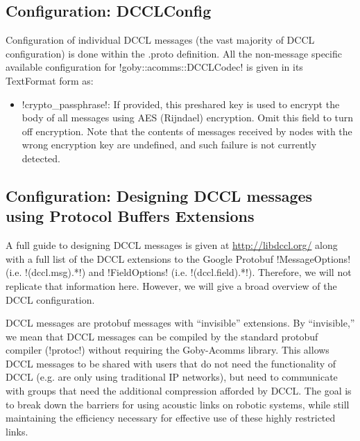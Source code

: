 \subsection{Configuration: DCCLConfig}

Configuration of individual DCCL messages (the vast majority of DCCL configuration) is done within the .proto definition. All the non-message specific available configuration for !goby::acomms::DCCLCodec! is given in its TextFormat form as:

\resetbvlinenumber

\begin{itemize}
\item !crypto_passphrase!: If provided, this preshared key is used to encrypt the body of all messages using AES (Rijndael) encryption. Omit this field to turn off encryption. Note that the contents of messages received by nodes with the wrong encryption key are undefined, and such failure is not currently detected.
\end{itemize}

\subsection{Configuration: Designing DCCL messages using Protocol Buffers Extensions}




A full guide to designing DCCL messages is given at \url{http://libdccl.org/} along with a full list of the DCCL extensions to the Google Protobuf !MessageOptions! (i.e. !(dccl.msg).*!) and !FieldOptions! (i.e. !(dccl.field).*!). Therefore, we will not replicate that information here. However, we will give a broad overview of the DCCL configuration.

DCCL messages are protobuf messages with ``invisible'' extensions. By ``invisible,'' we mean that DCCL messages can be compiled by the standard protobuf compiler (!protoc!) without requiring the Goby-Acomms library. This allows DCCL messages to be shared with users that do not need the functionality of DCCL (e.g. are only using traditional IP networks), but need to communicate with groups that need the additional compression afforded by DCCL. The goal is to break down the barriers for using acoustic links on robotic systems, while still maintaining the efficiency necessary for effective use of these highly restricted links.

